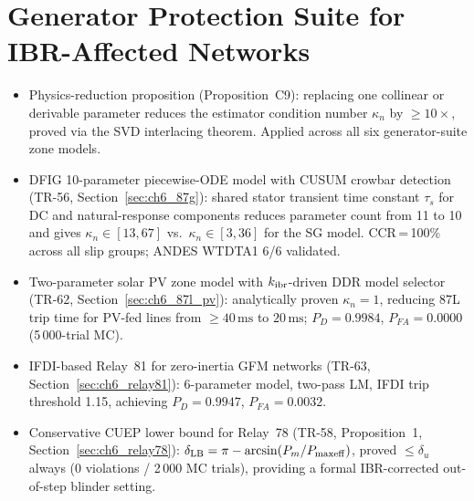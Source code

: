 \chapter{Generator Protection Suite for IBR-Affected Networks}
\label{ch:generator_suite}
\label{ch:microgrid}%

\begin{itemize}
  \item[\textbf{C9.}] Physics-reduction proposition (Proposition~C9): replacing
    one collinear or derivable parameter reduces the estimator condition number
    $\kappa_n$ by $\geq 10\times$, proved via the SVD interlacing theorem.
    Applied across all six generator-suite zone models.

  \item[\textbf{C10.}] DFIG 10-parameter piecewise-ODE model with CUSUM crowbar
    detection (TR-56, Section~\ref{sec:ch6_87g}): shared stator transient time
    constant $\tau_s$ for DC and natural-response components reduces parameter
    count from 11 to 10 and gives $\kappa_n \in [13, 67]$ vs.\ $\kappa_n \in
    [3, 36]$ for the SG model.
    CCR\,=\,100\% across all slip groups; ANDES WTDTA1 6/6 validated.

  \item[\textbf{C11.}] Two-parameter solar PV zone model with $k_{\rm ibr}$-driven
    DDR model selector (TR-62, Section~\ref{sec:ch6_87l_pv}):
    analytically proven $\kappa_n = 1$, reducing 87L trip time for PV-fed lines
    from $\geq 40\,\text{ms}$ to $20\,\text{ms}$;
    $P_D = 0.9984$, $P_{FA} = 0.0000$ (5\,000-trial MC).

  \item[\textbf{C12.}] IFDI-based Relay~81 for zero-inertia GFM networks
    (TR-63, Section~\ref{sec:ch6_relay81}): 6-parameter model, two-pass LM,
    IFDI trip threshold 1.15, achieving $P_D = 0.9947$, $P_{FA} = 0.0032$.

  \item[\textbf{C13.}] Conservative CUEP lower bound for Relay~78 (TR-58,
    Proposition~1, Section~\ref{sec:ch6_relay78}):
    $\delta_{\rm LB} = \pi - \arcsin(P_m / P_{\rm maxeff})$,
    proved $\leq \delta_u$ always (0 violations / 2\,000 MC trials),
    providing a formal IBR-corrected out-of-step blinder setting.


\end{itemize}
